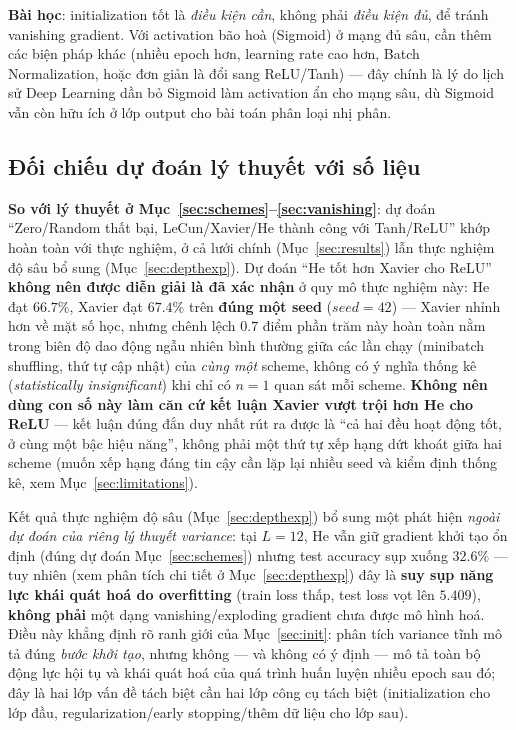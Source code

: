 \documentclass[12pt,a4paper]{article}
\newcommand{\en}[1]{\textit{#1}}
\begin{document}
\textbf{Bài học}: initialization tốt là \emph{điều kiện cần}, không phải
\emph{điều kiện đủ}, để tránh vanishing gradient. Với activation bão hoà
(Sigmoid) ở mạng đủ sâu, cần thêm các biện pháp khác (nhiều epoch hơn,
learning rate cao hơn, Batch Normalization, hoặc đơn giản là đổi sang
ReLU/Tanh) --- đây chính là lý do lịch sử Deep Learning dần bỏ Sigmoid làm
activation ẩn cho mạng sâu, dù Sigmoid vẫn còn hữu ích ở lớp output cho
bài toán phân loại nhị phân.

\subsection{Đối chiếu dự đoán lý thuyết với số liệu}

\textbf{So với lý thuyết ở Mục~\ref{sec:schemes}--\ref{sec:vanishing}}: dự
đoán ``Zero/Random thất bại, LeCun/Xavier/He thành công với Tanh/ReLU'' khớp
hoàn toàn với thực nghiệm, ở cả lưới chính (Mục~\ref{sec:results}) lẫn
thực nghiệm độ sâu bổ sung (Mục~\ref{sec:depthexp}). Dự đoán ``He tốt hơn
Xavier cho ReLU'' \textbf{không nên được diễn giải là đã xác nhận} ở quy
mô thực nghiệm này: He đạt $66.7\%$, Xavier đạt $67.4\%$ trên
\textbf{đúng một seed} ($seed{=}42$) --- Xavier nhỉnh hơn về mặt số học,
nhưng chênh lệch $0.7$ điểm phần trăm này hoàn toàn nằm trong biên độ
dao động ngẫu nhiên bình thường giữa các lần chạy (minibatch shuffling,
thứ tự cập nhật) của \emph{cùng một} scheme, không có ý nghĩa thống kê
(\en{statistically insignificant}) khi chỉ có $n{=}1$ quan sát mỗi
scheme. \textbf{Không nên dùng con số này làm căn cứ kết luận Xavier vượt
trội hơn He cho ReLU} --- kết luận đúng đắn duy nhất rút ra được là ``cả
hai đều hoạt động tốt, ở cùng một bậc hiệu năng'', không phải một thứ tự
xếp hạng dứt khoát giữa hai scheme (muốn xếp hạng đáng tin cậy cần lặp
lại nhiều seed và kiểm định thống kê, xem Mục~\ref{sec:limitations}).

Kết quả thực nghiệm độ sâu (Mục~\ref{sec:depthexp}) bổ sung một phát hiện
\emph{ngoài dự đoán của riêng lý thuyết variance}: tại $L{=}12$, He vẫn
giữ gradient khởi tạo ổn định (đúng dự đoán Mục~\ref{sec:schemes}) nhưng
test accuracy sụp xuống $32.6\%$ --- tuy nhiên (xem phân tích chi tiết
ở Mục~\ref{sec:depthexp}) đây là \textbf{suy sụp năng lực khái quát hoá
do overfitting} (train loss thấp, test loss vọt lên $5.409$), \textbf{không
phải} một dạng vanishing/exploding gradient chưa được mô hình hoá. Điều
này khẳng định rõ ranh giới của Mục~\ref{sec:init}: phân tích variance
tĩnh mô tả đúng \emph{bước khởi tạo}, nhưng không --- và không có ý định
--- mô tả toàn bộ động lực hội tụ và khái quát hoá của quá trình huấn
luyện nhiều epoch sau đó; đây là hai lớp vấn đề tách biệt cần hai lớp
công cụ tách biệt (initialization cho lớp đầu, regularization/early
stopping/thêm dữ liệu cho lớp sau).
\end{document}
